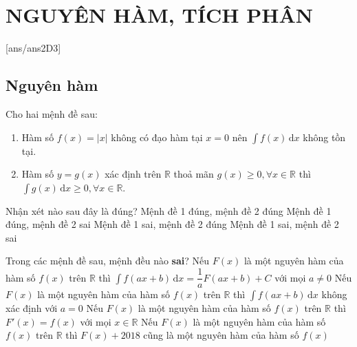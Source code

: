 \section{NGUYÊN HÀM, TÍCH PHÂN}
[ans/ans2D3]
\subsection{Nguyên hàm}
\begin{ex}%
	Cho hai mệnh đề sau:
	\begin{enumerate}[(1)]
		\item Hàm số $f(x)=|x|$ không có đạo hàm tại $x=0$ nên $\displaystyle \int f(x)\mathrm{\,d}x$ không tồn tại.
		\item Hàm số $y=g(x)$ xác định trên $\mathbb{R}$ thoả mãn $g(x)\ge 0, \forall x\in\mathbb{R}$ thì $\displaystyle \int g(x)\mathrm{\,d}x\ge 0,\forall x\in\mathbb{R}$.
	\end{enumerate}
	Nhận xét nào sau đây là đúng?
	\choice
	{Mệnh đề 1 đúng, mệnh đề 2 đúng}
	{Mệnh đề 1 đúng, mệnh đề 2 sai}
	{Mệnh đề 1 sai, mệnh đề 2 đúng}
	{\True Mệnh đề 1 sai, mệnh đề 2 sai}
\end{ex}
\begin{ex}%
	Trong các mệnh đề sau, mệnh đều nào \textbf{sai}?
	\choice
	{Nếu $F(x)$ là một nguyên hàm của hàm số $f(x)$ trên $\mathbb{R}$ thì $\displaystyle \int f(ax+b)\mathrm{\,d}x=\dfrac{1}{a}F(ax+b)+C$ với mọi $a\ne 0$}
	{\True Nếu $F(x)$ là một nguyên hàm của hàm số $f(x)$ trên $\mathbb{R}$ thì $\displaystyle \int f(ax+b)\mathrm{\,d}x$ không xác định với $a=0$}
	{Nếu $F(x)$ là một nguyên hàm của hàm số $f(x)$ trên $\mathbb{R}$ thì $F'(x)=f(x)$ với mọi $x\in \mathbb{R}$}
	{Nếu $F(x)$ là một nguyên hàm của hàm số $f(x)$ trên $\mathbb{R}$ thì $F(x)+2018$ cũng là một nguyên hàm của hàm số $f(x)$}
\end{ex}
